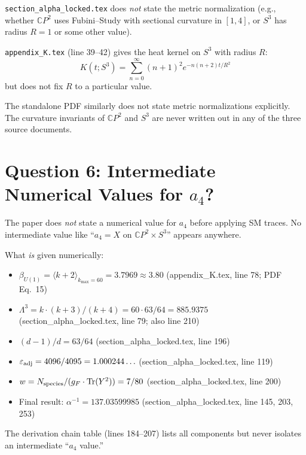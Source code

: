 \documentclass[12pt,a4paper]{article}
\begin{document}
\begin{tcolorbox}[colback=yellow!5!white, colframe=yellow!50!black,
  title=Answer: NOT EXPLICITLY STATED in section\_alpha\_locked.tex]

\texttt{section\_alpha\_locked.tex} does \emph{not} state the metric
normalization (e.g., whether $\mathbb{C}P^2$ uses Fubini--Study with
sectional curvature in $[1,4]$, or $S^3$ has radius $R = 1$ or
some other value).

\texttt{appendix\_K.tex} (line 39--42) gives the heat kernel on $S^3$
with radius $R$:
\[
K(t; S^3) = \sum_{n=0}^{\infty} (n+1)^2 e^{-n(n+2)t/R^2}
\]
but does not fix $R$ to a particular value.

The standalone PDF similarly does not state metric normalizations
explicitly.  The curvature invariants of $\mathbb{C}P^2$ and $S^3$
are never written out in any of the three source documents.
\end{tcolorbox}

\section{Question 6: Intermediate Numerical Values for $a_4$?}
\label{sec:q6}

\begin{tcolorbox}[colback=yellow!5!white, colframe=yellow!50!black,
  title=Answer: NO explicit $a_4$ numerical value is given]

The paper does \emph{not} state a numerical value for $a_4$ before
applying SM traces.  No intermediate value like ``$a_4 = X$ on
$\mathbb{C}P^2 \times S^3$'' appears anywhere.

What \emph{is} given numerically:
\begin{itemize}
\item $\beta_{U(1)} = \langle k+2 \rangle_{k_{\max}=60} = 3.7969 \approx 3.80$
  (appendix\_K.tex, line 78; PDF Eq.~15)
\item $\Lambda^3 = k \cdot (k+3)/(k+4) = 60 \cdot 63/64 = 885.9375$
  (section\_alpha\_locked.tex, line 79; also line 210)
\item $(d-1)/d = 63/64$ (section\_alpha\_locked.tex, line 196)
\item $\varepsilon_{\rm adj} = 4096/4095 = 1.000244\ldots$
  (section\_alpha\_locked.tex, line 119)
\item $w = N_{\rm species}/(g_F \cdot \mathrm{Tr}(Y^2)) = 7/80$
  (section\_alpha\_locked.tex, line 200)
\item Final result: $\alpha^{-1} = 137.03599985$
  (section\_alpha\_locked.tex, line 145, 203, 253)
\end{itemize}

The derivation chain table (lines 184--207) lists all components
but never isolates an intermediate ``$a_4$ value.''
\end{tcolorbox}
\end{document}
